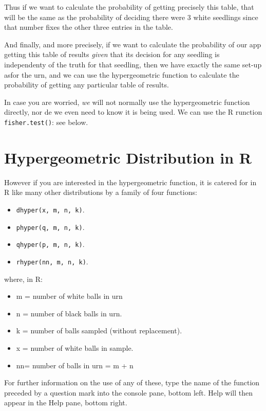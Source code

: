 \documentclass[
  letterpaper,
  DIV=11,
  numbers=noendperiod]{scrreprt}
\providecommand{\tightlist}{%
  \setlength{\itemsep}{0pt}\setlength{\parskip}{0pt}}\usepackage{longtable,booktabs,array}
\begin{document}
Thus if we want to calculate the probability of getting precisely this
table, that will be the same as the probability of deciding there were 3
white seedlings since that number fixes the other three entries in the
table.

And finally, and more precisely, if we want to calculate the probability
of our app getting this table of results \emph{given} that its decision
for any seedling is independenty of the truth for that seedling, then we
have exactly the same set-up asfor the urn, and we can use the
hypergeometric function to calculate the probability of getting any
particular table of results.

In case you are worried, \emph{we} will not normally use the
hypergeometric function directly, nor de we even need to know it is
being used. We can use the R runction \texttt{fisher.test()}: see below.

\section{Hypergeometric Distribution in
R}\label{hypergeometric-distribution-in-r}

However if you are interested in the hypergeometric function, it is
catered for in R like many other distributions by a family of four
functions:

\begin{itemize}
\tightlist
\item
  \texttt{dhyper(x,\ m,\ n,\ k)}.
\item
  \texttt{phyper(q,\ m,\ n,\ k)}.
\item
  \texttt{qhyper(p,\ m,\ n,\ k)}.
\item
  \texttt{rhyper(nn,\ m,\ n,\ k)}.
\end{itemize}

where, in R:

\begin{itemize}
\tightlist
\item
  m = number of white balls in urn\\
\item
  n = number of black balls in urn.
\item
  k = number of balls sampled (without replacement).
\item
  x = number of white balls in sample.
\item
  nn= number of balls in urn = m + n
\end{itemize}

For further information on the use of any of these, type the name of the
function preceded by a question mark into the console pane, bottom left.
Help will then appear in the Help pane, bottom right.
\end{document}
